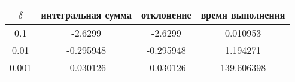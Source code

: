 \begin{tabular}{|c|c|c|c|}
    \hline
    $\delta$ & интегральная сумма & отклонение & время выполнения\\
    \hline
    0.1 & -2.6299 & -2.6299 & 0.010953\\
    \hline
    0.01 & -0.295948 & -0.295948 & 1.194271\\
    \hline
    0.001 & -0.030126 & -0.030126 & 139.606398\\
    \hline
\end{tabular}
